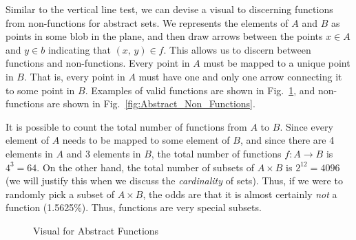         \par\vspace{2.5ex}
        Similar to the vertical line test, we can devise a visual to
        discerning functions from non-functions for abstract sets.
        We represents the elements of $A$ and $B$ as points in some blob
        in the plane, and then draw arrows between the points
        $x\in{A}$ and $y\in{b}$ indicating that $(x,\,y)\in{f}$.
        This allows us to discern between functions and non-functions.
        Every point in $A$ must be mapped to a unique point in $B$.
        That is, every point in $A$ must have one and only one arrow
        connecting it to some point in $B$. Examples of valid functions
        are shown in Fig.~\ref{fig:Abstract_Functions}, and non-functions
        are shown in Fig.~\ref{fig:Abstract_Non_Functions}.
        \par\hfill\par
        It is possible to count the total number of functions from $A$ to $B$.
        Since every element of $A$ needs to be mapped to some element of $B$,
        and since there are 4 elements in $A$ and 3 elements in $B$, the total
        number of functions $f:A\rightarrow{B}$ is $4^{3}=64$. On the other
        hand, the total number of subsets of $A\times{B}$ is $2^{12}=4096$
        (we will justify this when we discuss the \textit{cardinality} of
        sets). Thus, if we were to randomly pick a subset of $A\times{B}$, the
        odds are that it is almost certainly \textit{not} a function
        (1.5625\%). Thus, functions are very special subsets.
        \begin{figure}[H]
            \centering
            \begin{subfigure}[b]{0.49\textwidth}
                \centering
                \resizebox{\textwidth}{!}{%
                    
                }
            \end{subfigure}
            \begin{subfigure}[b]{0.49\textwidth}
                \centering
                \resizebox{\textwidth}{!}{%
                    
                }
            \end{subfigure}
            \caption{Visual for Abstract Functions}
            \label{fig:Abstract_Functions}
        \end{figure}

